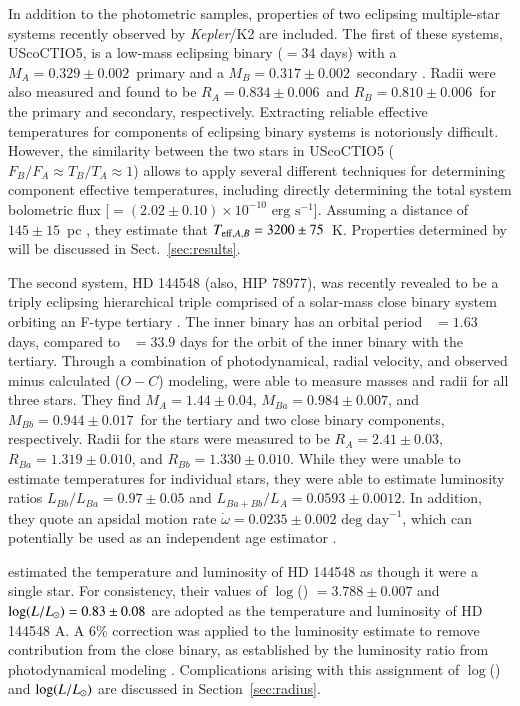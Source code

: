 \documentclass{aa}
\begin{document}
In addition to the photometric samples, properties of two eclipsing multiple-star systems recently observed by \emph{Kepler}/K2 are included. The first of these systems, UScoCTIO5, is a low-mass eclipsing binary (\porb$= 34$ days) with a $M_A = 0.329\pm0.002$\msun\ primary and a $M_B = 0.317\pm0.002$\msun\ secondary \citep{Kraus2015}. Radii were also measured and found to be $R_A = 0.834\pm0.006$\rsun\ and $R_B = 0.810\pm0.006$\rsun\ for the primary and secondary, respectively. Extracting reliable effective temperatures for components of eclipsing binary systems is notoriously difficult. However, the similarity between the two stars in UScoCTIO5 ($F_B/F_A \approx T_B/T_A \approx 1$) allows \citet{Kraus2015} to apply several different techniques for determining component effective temperatures, including directly determining the total system bolometric flux [\fbol$= (2.02\pm0.10)\times10^{-10}\textrm{ erg s}^{-1}$]. Assuming a distance of $145\pm15$~pc \citep{deZeeuw1999}, they estimate that $T_{{\rm eff}, A, B} = 3200\pm75$~K. Properties determined by \citet{David2016} will be discussed in Sect.~\ref{sec:results}.

The second system, HD 144548 (also, HIP 78977), was recently revealed to be a triply eclipsing hierarchical triple comprised of a solar-mass close binary system orbiting an F-type tertiary \citep{Alonso2015}. The inner binary has an orbital period \porb~$= 1.63$ days, compared to \porb~$= 33.9$ days for the orbit of the inner binary with the tertiary. Through a combination of photodynamical, radial velocity, and observed minus calculated ($O-C$) modeling, \citet{Alonso2015} were able to measure masses and radii for all three stars. They find $M_A = 1.44\pm0.04$\msun, $M_{Ba} = 0.984\pm0.007$\msun, and $M_{Bb} = 0.944\pm0.017$\msun\ for the tertiary and two close binary components, respectively. Radii for the stars were measured  to be $R_A = 2.41\pm0.03$\rsun, $R_{Ba} = 1.319\pm0.010$\rsun, and $R_{Bb} = 1.330\pm0.010$\rsun. While they were unable to estimate temperatures for individual stars, they were able to estimate luminosity ratios $L_{Bb}/L_{Ba} = 0.97\pm0.05$ and $L_{Ba + Bb}/L_{A} = 0.0593\pm0.0012$. In addition, they quote an apsidal motion rate $\dot{\omega} = 0.0235 \pm 0.002\textrm{ deg day}^{-1}$, which can potentially be used as an independent age estimator \citep{FD13}.

\citet{Pecaut2012} estimated the temperature and luminosity of HD 144548 as though it were a single star. For consistency, their values of $\log$(\teff) $ = 3.788\pm0.007$ and $\log(L/L_{\odot}) = 0.83\pm0.08$ are adopted as the temperature and luminosity of HD 144548 A. A 6\% correction was applied to the luminosity estimate to remove contribution from the close binary, as established by the luminosity ratio from photodynamical modeling \citep{Alonso2015}. Complications arising with this assignment of $\log$(\teff) and $\log(L/L_{\odot})$ are discussed in Section~\ref{sec:radius}.
\end{document}
